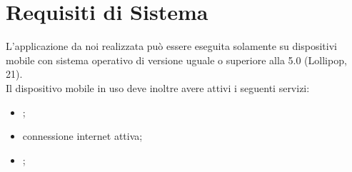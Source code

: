 \section{Requisiti di Sistema} 
L'applicazione da noi realizzata può essere eseguita solamente su dispositivi mobile con sistema operativo  di versione uguale o superiore alla 5.0 (Lollipop,  21). \\
Il dispositivo mobile in uso deve inoltre avere attivi i seguenti servizi:
\begin{itemize}
	\item {};
	\item connessione internet attiva;
	\item {};
\end{itemize} 